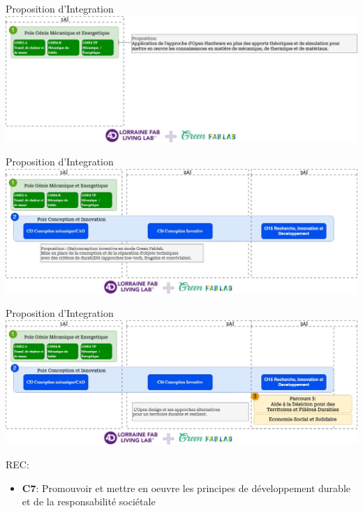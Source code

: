 \documentclass[
  11pt,
  ignorenonframetext,
  aspectratio=169,
  c]{beamer}
\providecommand{\tightlist}{%
  \setlength{\itemsep}{0pt}\setlength{\parskip}{0pt}}\usepackage{longtable,booktabs,array}
\begin{document}
\begin{frame}{Proposition d'Integration}
\protect\hypertarget{proposition-dintegration}{}
\includegraphics{Figures/slides/Ensegnement-Integration-01.jpg}
\end{frame}

\begin{frame}{Proposition d'Integration}
\protect\hypertarget{proposition-dintegration-1}{}
\includegraphics{Figures/slides/Ensegnement-Integration-02.jpg}
\end{frame}

\begin{frame}{Proposition d'Integration}
\protect\hypertarget{proposition-dintegration-2}{}
\includegraphics{Figures/slides/Ensegnement-Integration-03.jpg}

REC:

\begin{itemize}
\tightlist
\item
  \textbf{C7}: Promouvoir et mettre en oeuvre les principes de
  développement durable et de la responsabilité sociétale
\end{itemize}
\end{frame}
\end{document}

